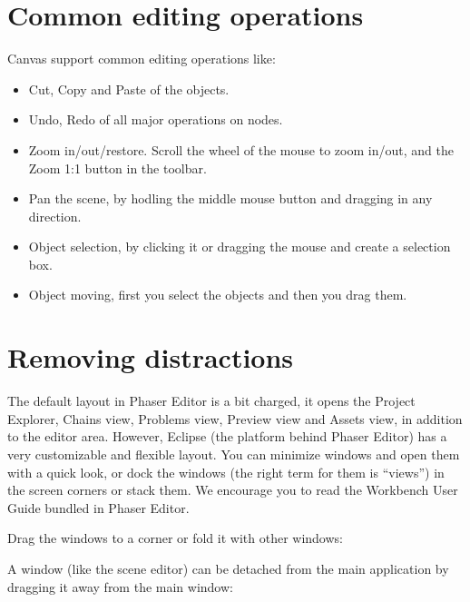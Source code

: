 \documentclass[letterpaper,10pt,english]{sphinxmanual}
\begin{document}
\section{Common editing operations}
\label{\detokenize{canvas:common-editing-operations}}
Canvas support common editing operations like:
\begin{itemize}
\item {} 
Cut, Copy and Paste of the objects.

\item {} 
Undo, Redo of all major operations on nodes.

\item {} 
Zoom in/out/restore. Scroll the wheel of the mouse to zoom in/out, and the Zoom 1:1 button in the toolbar.

\item {} 
Pan the scene, by hodling the middle mouse button and dragging in any direction.

\item {} 
Object selection, by clicking it or dragging the mouse and create a selection box.

\item {} 
Object moving, first you select the objects and then you drag them.

\end{itemize}


\section{Removing distractions}
\label{\detokenize{canvas:removing-distractions}}
The default layout in Phaser Editor is a bit charged, it opens the Project Explorer, Chains view, Problems view, Preview view and Assets view, in addition to the editor area. However, Eclipse (the platform behind Phaser Editor) has a very customizable and flexible layout. You can minimize windows and open them with a quick look, or dock the windows (the right term for them is “views”) in the screen corners or stack them. We encourage you to read the Workbench User Guide bundled in Phaser Editor.

Drag the windows to a corner or fold it with other windows:

\noindent{}

A window (like the scene editor) can be detached from the main application by dragging it away from the main window:

\noindent{}
\end{document}
